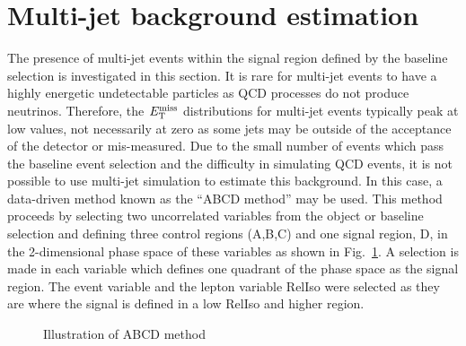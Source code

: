 \section{Multi-jet background estimation}
\label{sec:QCDbackground}
The presence of multi-jet events within the signal region defined by the baseline selection is investigated in this section. It is rare for multi-jet events to have a highly energetic undetectable particles as QCD processes do not produce neutrinos. Therefore, the $E_{\mathrm{T}}^{\text{miss}}$ distributions for multi-jet events typically peak at low values, not necessarily at zero as some jets may be outside of the acceptance of the detector or mis-measured. Due to the small number of events which pass the baseline event selection and the difficulty in simulating QCD events, it is not possible to use multi-jet simulation to estimate this background. In this case, a data-driven method known as the ``ABCD method'' may be used. This method proceeds by selecting two uncorrelated variables from the object or baseline selection and defining three control regions (A,B,C) and one signal region, D, in the 2-dimensional phase space of these variables as shown in Fig.~\ref{fig:ABCDdiagram}. A selection is made in each variable which defines one quadrant of the phase space as the signal region.  The event variable \MET and the lepton variable RelIso were selected as they are  where the signal is defined in a low RelIso and higher \MET region.\\

\begin{figure}[ht!]
\begin{center}
\hspace{0.2cm}
\end{center}
\caption{Illustration of ABCD method}
\label{fig:ABCDdiagram}
\end{figure}

